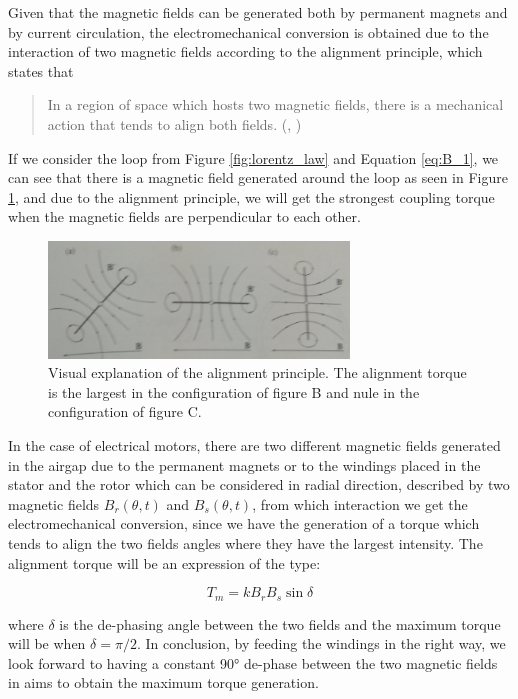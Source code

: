 \begin{description}
Given that the magnetic fields can be generated both by permanent magnets and by current circulation, the electromechanical conversion is obtained due to the interaction of two magnetic fields according to the alignment principle, which states that
\blockquote{In a region of space which hosts two magnetic fields, there is a mechanical action that tends to align both fields. (\citeauthor{sistemi_di_controllo:2007}, \citeyear{sistemi_di_controllo:2007})}

If we consider the loop from Figure \ref{fig:lorentz_law} and Equation \ref{eq:B_1}, we can see that there is a magnetic field generated around the loop as seen in Figure \ref{fig:alignment}, and due to the alignment principle, we will get the strongest coupling torque when the magnetic fields are perpendicular to each other.

\begin{figure}[htbp]
\centering
\includegraphics[width=8cm]{Images/alignment.png} 
\caption[Alignment Principle]{Visual explanation of the alignment principle. The alignment torque is the largest in the configuration of figure B and nule in the configuration of figure C.}
\label{fig:alignment}
\end{figure}

In the case of electrical motors, there are two different magnetic fields generated in the airgap due to the permanent magnets or to the windings placed in the stator and the rotor which can be considered in radial direction, described by two magnetic fields $B_{r}(\theta,t)$ and $B_{s}(\theta,t)$, from which interaction we get the electromechanical conversion, since we have the generation of a torque which tends to align the two fields angles where they have the largest intensity. The alignment torque will be an expression of the type:

\begin{equation}
	\label{eq:torque_2}
	T_{m} = k B_{r} B_{s} \sin \delta
\end{equation}

where $\delta$ is the de-phasing angle between the two fields and the maximum torque will be when $\delta = \pi / 2$. In conclusion, by feeding the windings in the right way, we look forward to having a constant 90° de-phase between the two magnetic fields in aims to obtain the maximum torque generation.


\end{description}

